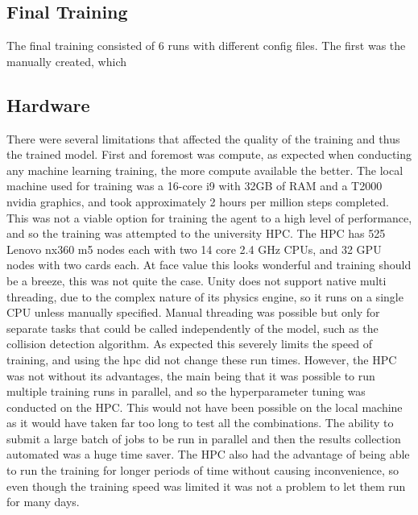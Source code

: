 \subsection{Final Training}

The final training consisted of 6 runs with different config files. The first was the manually created, which 



\subsection{Hardware}\label{sec:hardware_evaluation}
There were several limitations that affected the quality of the training and thus the trained model. First and foremost was compute, as expected when conducting any machine learning training, the more compute available the better. The local machine used for training was a 16-core i9 with 32GB of RAM and a T2000 nvidia graphics, and took approximately 2 hours per million steps completed. This was not a viable option for training the agent to a high level of performance, and so the training was attempted to the university HPC. The HPC has 525 Lenovo nx360 m5 nodes each with two 14 core 2.4 GHz CPUs, and 32 GPU nodes with two cards each. At face value this looks wonderful and training should be a breeze, this was not quite the case. Unity does not support native multi threading, due to the complex nature of its physics engine, so it runs on a single CPU unless manually specified. Manual threading was possible but only for separate tasks that could be called independently of the model, such as the collision detection algorithm. As expected this severely limits the speed of training, and using the hpc did not change these run times.
However, the HPC was not without its advantages, the main being that it was possible to run multiple training runs in parallel, and so the hyperparameter tuning was conducted on the HPC. This would not have been possible on the local machine as it would have taken far too long to test all the combinations. The ability to submit a large batch of jobs to be run in parallel and then the results collection automated was a huge time saver. The HPC also had the advantage of being able to run the training for longer periods of time without causing inconvenience, so even though the training speed was limited it was not a problem to let them run for many days. 

